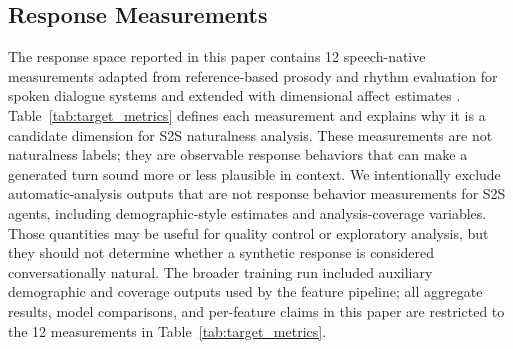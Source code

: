 \documentclass[conference]{IEEEtran}
\begin{document}
\subsection{Response Measurements}
The response space reported in this paper contains 12 speech-native measurements adapted from reference-based prosody and rhythm evaluation for spoken dialogue systems and extended with dimensional affect estimates \cite{DISTRIB}.
Table~\ref{tab:target_metrics} defines each measurement and explains why it is a candidate dimension for S2S naturalness analysis.
These measurements are not naturalness labels; they are observable response behaviors that can make a generated turn sound more or less plausible in context.
We intentionally exclude automatic-analysis outputs that are not response behavior measurements for S2S agents, including demographic-style estimates and analysis-coverage variables.
Those quantities may be useful for quality control or exploratory analysis, but they should not determine whether a synthetic response is considered conversationally natural.
The broader training run included auxiliary demographic and coverage outputs used by the feature pipeline; all aggregate results, model comparisons, and per-feature claims in this paper are restricted to the 12 measurements in Table~\ref{tab:target_metrics}.
\end{document}
